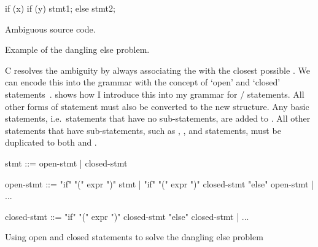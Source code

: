 \documentclass[00-main.tex]{subfiles}
\begin{document}
\begin{listing}[t]
  \begin{sublisting}[b]{0.25\textwidth}
    \begin{CListing}
      if (x)
        if (y)
          stmt1;
      else
        stmt2;
    \end{CListing}
    \caption{Ambiguous source code.}
  \end{sublisting}
  \hfill
  \hfill
  \caption{Example of the dangling else problem.}
  \label{lst:dangling else}
\end{listing}

C resolves the ambiguity by always associating the  with the closest possible .
We can encode this into the grammar with the concept of `open' and `closed' statements~.
 shows how I introduce this into my grammar for / statements.
All other forms of statement must also be converted to the new structure.
Any basic statements, i.e.\ statements that have no sub-statements, are added to .
All other statements that have sub-statements, such as , , and  statements, must be duplicated to both  and .


\begin{listing}[t]
  \begin{GrammarListing}
    stmt        ::= open-stmt | closed-stmt

    open-stmt   ::= "if" "(" expr ")" stmt
                  | "if" "(" expr ")" closed-stmt "else" open-stmt
                  | ...

    closed-stmt ::= "if" "(" expr ")" closed-stmt "else" closed-stmt
                  | ...
  \end{GrammarListing}
  \caption{Using open and closed statements to solve the dangling else problem}
  \label{lst:open/closed statement grammar}
\end{listing}
\end{document}

